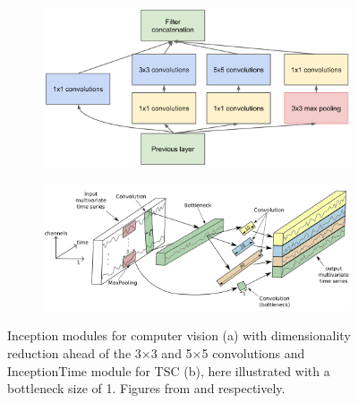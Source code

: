 

\begin{figure}
  \centering
  \begin{subfigure}[c]{0.6\textwidth}
    \includegraphics[width=\textwidth]{files/figs/tsc/inception-module-dimred.png}
    \caption{}
    \label{fig:inception-module}
  \end{subfigure}
  \begin{subfigure}[c]{0.6\textwidth}
    \includegraphics[width=\textwidth]{files/figs/tsc/inception-time-module.png}
    \caption{}
    \label{fig:inceptiontime-module}
  \end{subfigure}
  \caption{Inception modules for computer vision (a) with dimensionality reduction ahead of the 3$\times$3 and 5$\times$5 convolutions and InceptionTime module for TSC (b), here illustrated with a bottleneck size of 1. Figures from \cite{Szegedy2015} and \cite{IsmailFawaz2020} respectively.}
\end{figure}

